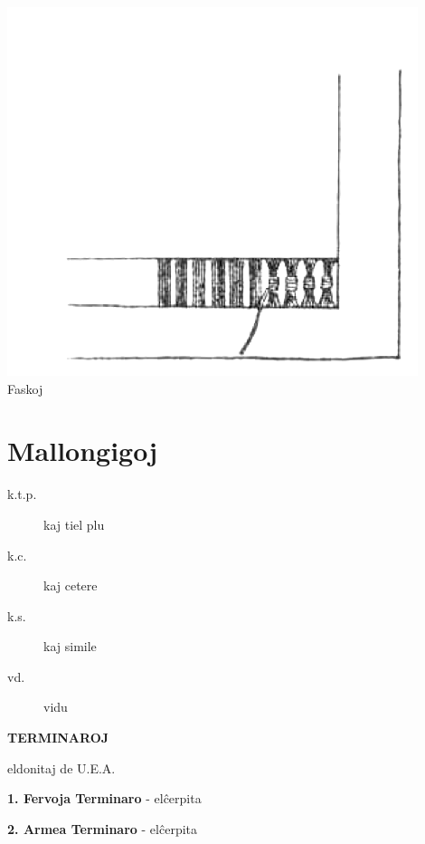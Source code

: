 \begin{center}\includegraphics[keepaspectratio,width=\textwidth,height=0.75\textheight]{15.png}\\
Faskoj\end{center}

\chapter[Mallongigoj]{Mallongigoj}


\begin{description}
\item[k.t.p.]

 kaj tiel plu

\item[k.c.]

 kaj cetere

\item[k.s.]

 kaj simile

\item[vd.]

 vidu
\end{description}

\newpage

\textbf{TERMINAROJ}

eldonitaj de U.E.A.

\textbf{1. Fervoja Terminaro}		-	elĉerpita

\textbf{2. Armea Terminaro}		-	elĉerpita

